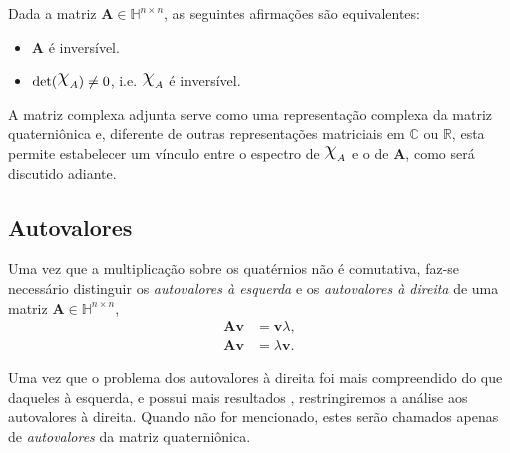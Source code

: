 \begin{theorem}
\label{th:equiv02}
Dada a matriz $ \mathbf{A} \in \mathbb{H}^{n \times n} $, as seguintes afirma\c c\~oes s\~ao equivalentes:

\begin{itemize}[noitemsep]
\item $\mathbf{A}$ \'e invers\'ivel.
\item $\mathrm{det}(\rchi_A) \neq 0$, i.e. $\rchi_{A}$ \'e invers\'ivel.
\end{itemize}

\end{theorem}



A matriz complexa adjunta serve como uma representa\c c\~ao complexa da matriz quaterni\^onica e, diferente de outras representa\c c\~oes matriciais em $ \mathbb{C} $ ou $ \mathbb{R} $, esta permite estabelecer um v\'inculo entre o espectro de $ \rchi_{A} $ e o de $ \mathbf{A} $, como ser\'a discutido adiante.

\subsection{Autovalores}

Uma vez que a multiplica\c c\~ao sobre os quat\'ernios n\~ao \'e comutativa, faz-se necess\'ario distinguir os \emph{autovalores \`a esquerda} e os \emph{autovalores \`a direita} de uma matriz $ \mathbf{A} \in \mathbb{H}^{n \times n} $,
\begin{align*}
\mathbf{A} \mathbf{v} &= \mathbf{v} \lambda, \tag{autovalor \`a direita} \\
\mathbf{A} \mathbf{v} &= \lambda \mathbf{v}.  \tag{autovalor \`a esquerda}
\end{align*}

Uma vez que o problema dos autovalores \`a direita foi mais compreendido do que daqueles \`a esquerda, e possui mais resultados \cite[Cap. 5]{zhang1997quaternions}, restringiremos a an\'alise aos autovalores \`a direita. Quando n\~ao for mencionado, estes ser\~ao chamados apenas de \emph{autovalores} da matriz quaterni\^onica.

